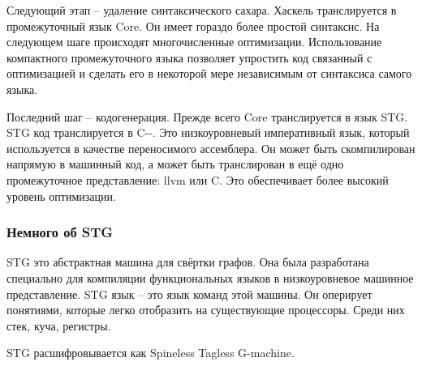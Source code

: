 \documentclass[fontsize=14pt, paper=a4, pagesize, DIV=calc]{scrartcl}
\begin{document}
Следующий этап -- удаление синтаксического сахара. Хаскель транслируется в
промежуточный язык Core. Он имеет гораздо более простой синтаксис. На следующем
шаге происходят многочисленные оптимизации. Использование компактного
промежуточного языка позволяет упростить код связанный с оптимизацией и сделать
его в некоторой мере независимым от синтаксиса самого языка.

Последний шаг -- кодогенерация. Прежде всего Core транслируется в язык STG.
STG код транслируется в C-{}-. Это низкоуровневый императивный язык, который
используется в качестве переносимого ассемблера. Он может быть скомпилирован
напрямую в машинный код, а может быть транслирован в ещё одно промежуточное
представление: llvm или C. Это обеспечивает более высокий уровень оптимизации.

\subsubsection{Немного об STG}

STG это абстрактная машина для свёртки графов. Она была разработана специально
для компиляции функциональных языков в низкоуровневое машинное представление.
STG язык -- это язык команд этой машины. Он оперирует понятиями, которые легко
отобразить на существующие процессоры. Среди них стек, куча, регистры. 

STG расшифровывается как Spineless Tagless G-machine.
\end{document}

